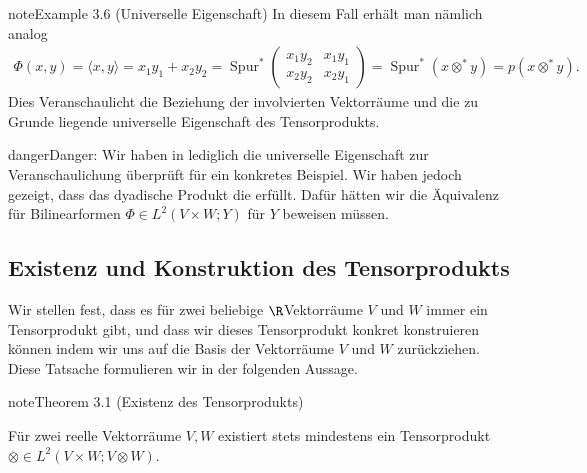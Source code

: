 \documentclass[letterpaper,10pt,english]{jupyterBook}
\begin{document}
\begin{sphinxadmonition}{note}{Example 3.6 (Universelle Eigenschaft)}
In diesem Fall erhält man nämlich analog
\begin{equation*}
\begin{split}\Phi(x,y) = \langle x, y \rangle = x_1y_1 + x_2y_2 = \operatorname{Spur}^*
\begin{pmatrix}
x_1y_2 & x_1y_1 \\
x_2y_2 & x_2y_1
\end{pmatrix}
 = \operatorname{Spur}^*(x \otimes^* y) = p(x \otimes^* y).\end{split}
\end{equation*}
\sphinxAtStartPar
Dies Veranschaulicht die Beziehung der involvierten Vektorräume und die zu Grunde liegende universelle Eigenschaft des Tensorprodukts.
\end{sphinxadmonition}

\begin{sphinxadmonition}{danger}{Danger:}
\sphinxAtStartPar
Wir haben in {\hyperref[\detokenize{vektoranalysis/tensor:ex:universelleEigenschaft}]{}} lediglich die universelle Eigenschaft zur Veranschaulichung überprüft für ein konkretes Beispiel.
Wir haben jedoch  gezeigt, dass das dyadische Produkt die  erfüllt.
Dafür hätten wir die Äquivalenz für  Bilinearformen \(\Phi \in L^2(V \times W; Y)\) für  \(Y\) beweisen müssen.
\end{sphinxadmonition}


\subsection{Existenz und Konstruktion des Tensorprodukts}
\label{\detokenize{vektoranalysis/tensor:existenz-und-konstruktion-des-tensorprodukts}}
\sphinxAtStartPar
Wir stellen fest, dass es für zwei beliebige \(\R\)\sphinxhyphen{}Vektorräume \(V\) und \(W\) immer ein Tensorprodukt gibt, und dass wir dieses Tensorprodukt konkret konstruieren können indem wir uns auf die Basis der Vektorräume \(V\) und \(W\) zurückziehen.
Diese Tatsache formulieren wir in der folgenden Aussage.
\label{vektoranalysis/tensor:thm:existenzTensorprodukt}
\begin{sphinxadmonition}{note}{Theorem 3.1 (Existenz des Tensorprodukts)}



\sphinxAtStartPar
Für zwei reelle Vektorräume \(V, W\) existiert stets mindestens ein Tensorprodukt \(\otimes\in L^2(V\times W; V\otimes W)\).
\end{sphinxadmonition}
\end{document}
